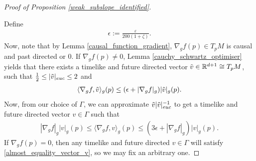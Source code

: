 \documentclass[a4paper,10pt]{article}
\numberwithin{equation}{section}
\newcommand{\R}{\mathbb{R}}
\newcommand{\e}{\varepsilon}
\begin{document}
\begin{proof}[Proof of Proposition \ref{weak_subslope_identified}]
\begin{itemize}
    \end{itemize}
    Define
    \begin{align}\label{choice_of_epsilon}
        \epsilon := \frac{\e}{200(1+\zeta)}. 
    \end{align}
    Now, note that by Lemma \ref{causal_function_gradient}, $\nabla_g f(p) \in T_pM$ is causal and past directed or $0$. If  $\nabla_g f(p)\neq 0$, Lemma \ref{cauchy_schwartz_optimiser} yields that there exists a timelike and future directed vector $\Tilde{v} \in \R^{d+1} \cong T_pM$, such that $\frac{1}{2} \leq|\Tilde{v}|_{euc} \leq 2$ and
    \begin{align}
        \langle \nabla_g f, \Tilde{v} \rangle_g(p) \leq (\epsilon + |\nabla_g f|_g )|\Tilde{v}|_g(p).
    \end{align}
    Now, from our choice of $\Gamma$, we can approximate $\Tilde{v}|\Tilde{v}|_{euc}^{-1}$ to get a timelike and future directed vector $v \in \Gamma$ such that
    \begin{align}\label{almost_equality_vector_v}
        |\nabla_g f|_g |v|_g(p) \leq \langle \nabla_g f, v \rangle_g(p) \leq (3\epsilon + |\nabla_g f|_g) |v|_g(p).
    \end{align}
    If $\nabla_gf(p)=0$, then any timelike and future directed $v \in \Gamma$ will satisfy \eqref{almost_equality_vector_v}, so we may fix an arbitrary one.


\end{proof}
\end{document}
